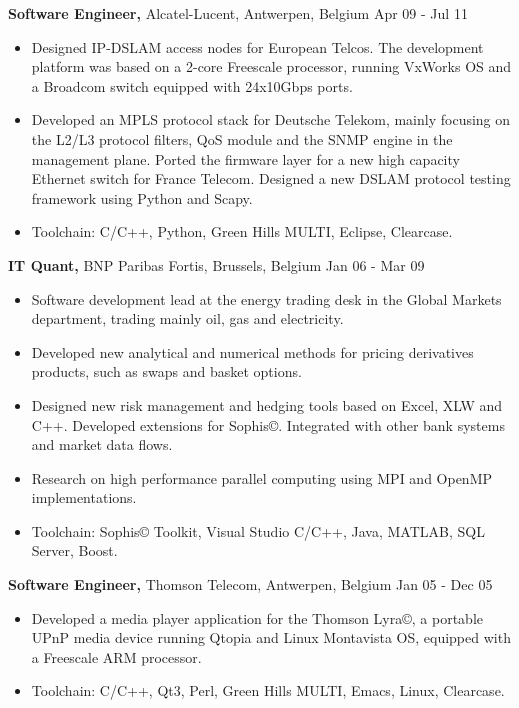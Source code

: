 \documentclass[margin]{res}
\begin{document}
\begin{resume}
{\bf Software Engineer,} Alcatel-Lucent, Antwerpen, Belgium \hfill  Apr 09 - Jul 11
\begin{itemize} \itemsep -2pt %
\item Designed IP-DSLAM access nodes for European Telcos. The development platform was based on a 2-core Freescale processor, running VxWorks OS and a Broadcom switch equipped with 24x10Gbps ports.
\item Developed an MPLS protocol stack for Deutsche Telekom, mainly focusing on the L2/L3 protocol filters, QoS module and the SNMP engine in the management plane. Ported the firmware layer for a new high capacity Ethernet switch for France Telecom. Designed a new DSLAM protocol testing framework using Python and Scapy. 
\item Toolchain: C/C++, Python, Green Hills MULTI, Eclipse, Clearcase.
\end{itemize}

{\bf IT Quant,} BNP Paribas Fortis, Brussels, Belgium \hfill  Jan 06 - Mar 09
\begin{itemize} \itemsep -2pt %
\item Software development lead at the energy trading desk in the Global Markets department, trading mainly oil, gas and electricity.
\item Developed new analytical and numerical methods for pricing derivatives products, such as swaps and basket options.
\item Designed new risk management and hedging tools based on Excel, XLW and C++. Developed extensions for Sophis©. Integrated with other bank systems and market data flows.
\item Research on high performance parallel computing using MPI and OpenMP implementations.
\item Toolchain: Sophis© Toolkit, Visual Studio C/C++, Java, MATLAB, SQL Server, Boost.
\end{itemize}

{\bf Software Engineer,} Thomson Telecom, Antwerpen, Belgium \hfill  Jan 05 - Dec 05
\begin{itemize} \itemsep -2pt %
\item Developed a media player application for the Thomson Lyra©, a portable UPnP media device running Qtopia and Linux Montavista OS, equipped with a Freescale ARM processor.
\item Toolchain: C/C++, Qt3, Perl, Green Hills MULTI, Emacs, Linux, Clearcase.
\end{itemize}


\end{resume}
\end{document}
